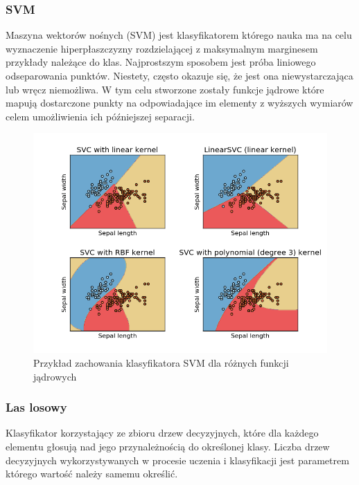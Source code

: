 \documentclass[a4paper]{report}
\begin{document}
\subsubsection{SVM}

Maszyna wektorów nośnych (SVM) jest klasyfikatorem którego nauka ma na celu wyznaczenie hiperpłaszczyzny rozdzielającej z maksymalnym marginesem przykłady należące do klas. Najprostszym sposobem jest próba liniowego odseparowania punktów. Niestety, często okazuje się, że jest ona niewystarczająca lub wręcz niemożliwa. W tym celu stworzone zostały funkcje jądrowe które mapują dostarczone punkty na odpowiadające im elementy z wyższych wymiarów celem umożliwienia ich późniejszej separacji. 

\begin{figure}[!htp]
	\centering
	\includegraphics[scale=0.6]{svm.png}
	\caption{Przykład zachowania klasyfikatora SVM dla różnych funkcji jądrowych}
	\label{svmfigure}
\end{figure}


\subsubsection{Las losowy}
Klasyfikator korzystający ze zbioru drzew decyzyjnych, które dla każdego elementu głosują nad jego przynależnością do określonej klasy. Liczba drzew decyzyjnych wykorzystywanych w procesie uczenia i klasyfikacji jest parametrem którego wartość należy samemu określić.
\end{document}

